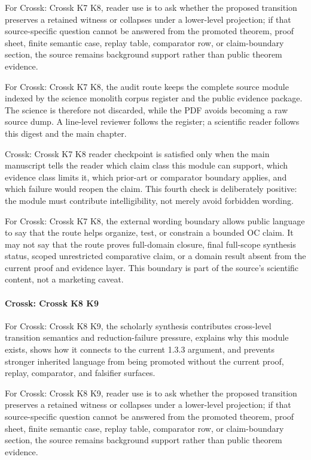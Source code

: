 For Crossk: Crossk K7 K8, reader use is to ask whether the proposed transition preserves a retained witness or collapses under a lower-level projection; if that source-specific question cannot be answered from the promoted theorem, proof sheet, finite semantic case, replay table, comparator row, or claim-boundary section, the source remains background support rather than public theorem evidence.


For Crossk: Crossk K7 K8, the audit route keeps the complete source module indexed by the science monolith corpus register and the public evidence package. The science is therefore not discarded, while the PDF avoids becoming a raw source dump. A line-level reviewer follows the register; a scientific reader follows this digest and the main chapter.


Crossk: Crossk K7 K8 reader checkpoint is satisfied only when the main manuscript tells the reader which claim class this module can support, which evidence class limits it, which prior-art or comparator boundary applies, and which failure would reopen the claim. This fourth check is deliberately positive: the module must contribute intelligibility, not merely avoid forbidden wording.


For Crossk: Crossk K7 K8, the external wording boundary allows public language to say that the route helps organize, test, or constrain a bounded OC claim. It may not say that the route proves full-domain closure, final full-scope synthesis status, scoped unrestricted comparative claim, or a domain result absent from the current proof and evidence layer. This boundary is part of the source's scientific content, not a marketing caveat.


\paragraph{Crossk: Crossk K8 K9}

For Crossk: Crossk K8 K9, the scholarly synthesis contributes cross-level transition semantics and reduction-failure pressure, explains why this module exists, shows how it connects to the current 1.3.3 argument, and prevents stronger inherited language from being promoted without the current proof, replay, comparator, and falsifier surfaces.


For Crossk: Crossk K8 K9, reader use is to ask whether the proposed transition preserves a retained witness or collapses under a lower-level projection; if that source-specific question cannot be answered from the promoted theorem, proof sheet, finite semantic case, replay table, comparator row, or claim-boundary section, the source remains background support rather than public theorem evidence.


